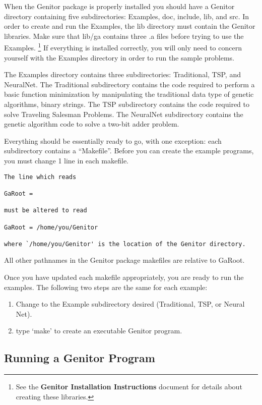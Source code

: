 When the Genitor package is properly installed you should have a Genitor
directory containing five subdirectories: Examples, doc, include, lib,
and src. In order to create and run the Examples, the lib directory must
contain the Genitor libraries. Make sure that lib/ga contains three .a 
files before trying to use the Examples.  \footnote{See the
{\bf Genitor Installation Instructions} document for details about creating
these libraries.}  If everything is installed correctly, you will only need
to concern yourself with the Examples directory in order to run the sample
problems.

The Examples directory contains three subdirectories: Traditional,
TSP, and NeuralNet. The Traditional subdirectory contains the code
required to perform a basic function minimization by manipulating the
traditional data type of genetic algorithms, binary strings.  The TSP
subdirectory contains the code required to solve Traveling Salesman
Problems. The NeuralNet subdirectory contains the genetic algorithm
code to solve a two-bit adder problem.

Everything should be essentially ready to go, with one exception:
each subdirectory contains a ``Makefile''.  Before you can create
the example programs, you must change 1 line in each makefile.

\begin{verbatim}
The line which reads

GaRoot = 

must be altered to read

GaRoot = /home/you/Genitor

where `/home/you/Genitor' is the location of the Genitor directory.
\end{verbatim}

All other pathnames in the Genitor package makefiles are relative to
GaRoot. 

Once you have updated each makefile appropriately, you are ready to
run the examples.  The following two steps are the same for each example:

\begin{enumerate}
 \item Change to the Example subdirectory desired (Traditional, TSP, or
	   Neural Net). 
 \item type `make' to create an executable Genitor program.
\end{enumerate}

\subsection{Running a Genitor Program}

